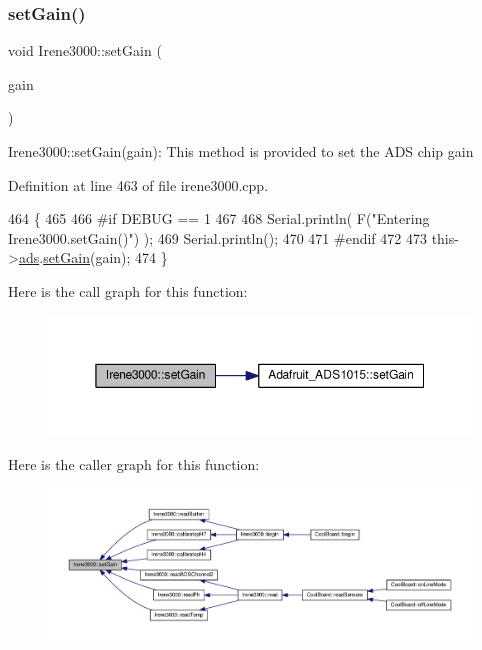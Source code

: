 \subsubsection{\texorpdfstring{set\+Gain()}{setGain()}}
{\footnotesize\ttfamily void Irene3000\+::set\+Gain (\begin{DoxyParamCaption}\item[{\hyperlink{_cool_adafruit___a_d_s1015_8h_a3d6c0e15829a207b9155890811fa4781}{ads\+Gain\+\_\+t}}]{gain }\end{DoxyParamCaption})}

Irene3000\+::set\+Gain(gain)\+: This method is provided to set the A\+DS chip gain 

Definition at line 463 of file irene3000.\+cpp.


\begin{DoxyCode}
464 \{
465 
466 \textcolor{preprocessor}{#if DEBUG == 1  }
467 
468     Serial.println( F(\textcolor{stringliteral}{"Entering Irene3000.setGain()"}) );
469     Serial.println();
470 
471 \textcolor{preprocessor}{#endif}
472 
473     this->\hyperlink{class_irene3000_a1215e77ba761c9908d80d691f149e135}{ads}.\hyperlink{class_adafruit___a_d_s1015_a399441eace686975ff22937cbe45cc50}{setGain}(gain);
474 \}
\end{DoxyCode}
Here is the call graph for this function\+:\nopagebreak
\begin{figure}[H]
\begin{center}
\leavevmode
\includegraphics[width=350pt]{d6/d03/class_irene3000_aff7c5da186b388e7272e63ff88a20c34_cgraph}
\end{center}
\end{figure}
Here is the caller graph for this function\+:\nopagebreak
\begin{figure}[H]
\begin{center}
\leavevmode
\includegraphics[width=350pt]{d6/d03/class_irene3000_aff7c5da186b388e7272e63ff88a20c34_icgraph}
\end{center}
\end{figure}


